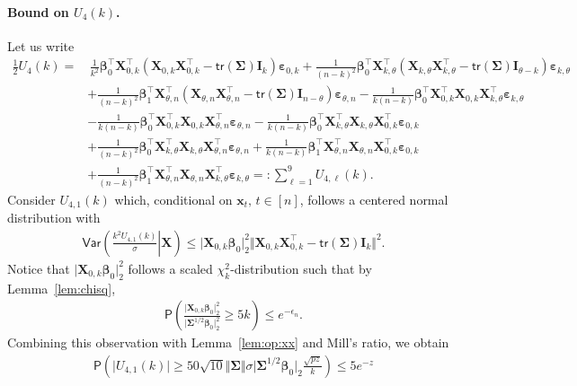 \documentclass[11pt, a4paper]{article}
\newcommand{\mbf}{\mathbf}
\newcommand{\eps}{\epsilon}
\newcommand{\vep}{\varepsilon}
\renewcommand{\l}{\left}
\renewcommand{\r}{\right}
\newcommand{\cp}{\theta}
\newcommand{\Var}[0]{\mathsf{Var}}
\newcommand{\tr}[0]{\mathsf{tr}}
\newcommand{\p}{\mathsf{P}}
\theoremstyle{definition}
\theoremstyle{definition}
\theoremstyle{definition}
\theoremstyle{definition}
\theoremstyle{definition}
\theoremstyle{remark}
\theoremstyle{definition}
\theoremstyle{definition}
\theoremstyle{definition}
\begin{document}
\paragraph{Bound on $U_4(k)$.} Let us write
\begin{align*}
\frac{1}{2} U_4(k) = & \, 
\frac{1}{k^2} \bm\beta_0^\top \mbf X_{0, k}^\top (\mbf X_{0, k} \mbf X_{0, k}^\top - \tr(\bm\Sigma) \mbf I_k) \bm\vep_{0, k} 
+ \frac{1}{(n - k)^2} \bm\beta_0^\top \mbf X_{k, \cp}^\top (\mbf X_{k, \cp} \mbf X_{k, \cp}^\top - \tr(\bm\Sigma) \mbf I_{\cp - k}) \bm\vep_{k, \cp}
\\
& + \frac{1}{(n - k)^2} \bm\beta_1^\top \mbf X_{\cp, n}^\top (\mbf X_{\cp, n} \mbf X_{\cp, n}^\top - \tr(\bm\Sigma) \mbf I_{n - \cp}) \bm\vep_{\cp, n}
- \frac{1}{k(n - k)} \bm\beta_0^\top \mbf X_{0, k}^\top \mbf X_{0, k} \mbf X_{k, \cp}^\top \bm\vep_{k, \cp} 
\\
& - \frac{1}{k(n - k)} \bm\beta_0^\top \mbf X_{0, k}^\top \mbf X_{0, k} \mbf X_{\cp, n}^\top \bm\vep_{\cp, n} 
- \frac{1}{k(n - k)} \bm\beta_0^\top \mbf X_{k, \cp}^\top \mbf X_{k, \cp} \mbf X_{0, k}^\top \bm\vep_{0, k} 
\\
& + \frac{1}{(n - k)^2} \bm\beta_0^\top \mbf X_{k, \cp}^\top \mbf X_{k, \cp} \mbf X_{\cp, n}^\top \bm\vep_{\cp, n}
+ \frac{1}{k(n - k)} \bm\beta_1^\top \mbf X_{\cp, n}^\top \mbf X_{\cp, n} \mbf X_{0, k}^\top \bm\vep_{0, k}
\\
& 
+ \frac{1}{(n - k)^2} \bm\beta_1^\top \mbf X_{\cp, n}^\top \mbf X_{\cp, n} \mbf X_{k, \cp}^\top \bm\vep_{k, \cp}
=: \sum_{\ell = 1}^9 U_{4, \ell}(k).
\end{align*}
Consider $U_{4, 1}(k)$ which, conditional on $\mbf x_t, \, t \in [n]$, follows a centered normal distribution with
\begin{align*}
\Var\l( \l. \frac{k^2 U_{4, 1}(k)}{\sigma} \r\vert \mbf X \r) \le 
\vert \mbf X_{0, k} \bm\beta_0 \vert_2^2 \Vert \mbf X_{0, k}\mbf X_{0, k}^\top - \tr(\bm\Sigma) \mbf I_k \Vert^2.
\end{align*}
Notice that $\vert \mbf X_{0, k} \bm\beta_0 \vert_2^2$ follows a scaled $\chi_k^2$-distribution such that by Lemma~\ref{lem:chisq},
\begin{align*}
\p\l( \frac{\vert \mbf X_{0, k} \bm\beta_0 \vert_2^2}{\vert \bm\Sigma^{1/2} \bm\beta_0 \vert_2^2} \ge 5 k \r) \le e^{-\eps_n}.
\end{align*}
Combining this observation with Lemma~\ref{lem:op:xx} and Mill's ratio, we obtain
\begin{align*}
\p\l( \vert U_{4, 1}(k) \vert \ge 
50\sqrt{10} \Vert \bm\Sigma \Vert \sigma \vert \bm\Sigma^{1/2} \bm\beta_0 \vert_2 \frac{\sqrt{p z}}{k} \r) \le 5 e^{-z}
\end{align*}
\end{document}

